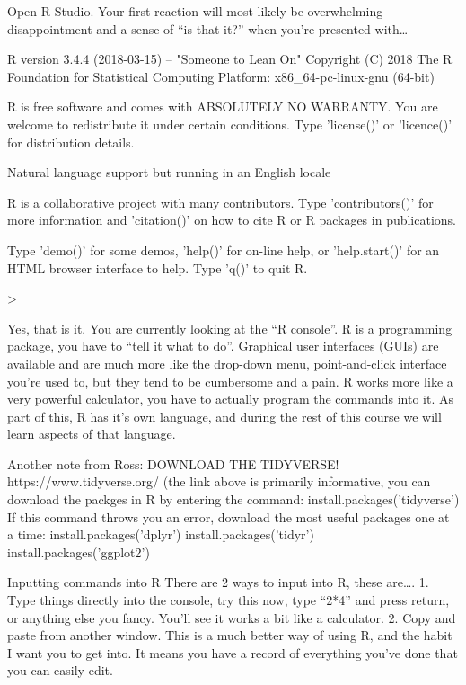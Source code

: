 \documentclass{article}
\begin{document}
Open R Studio.
Your first reaction will most likely be overwhelming disappointment and a sense of “is that it?” when you’re presented with…

R version 3.4.4 (2018-03-15) -- "Someone to Lean On"
Copyright (C) 2018 The R Foundation for Statistical Computing
Platform: x86\_64-pc-linux-gnu (64-bit)

R is free software and comes with ABSOLUTELY NO WARRANTY.
You are welcome to redistribute it under certain conditions.
Type 'license()' or 'licence()' for distribution details.

  Natural language support but running in an English locale

R is a collaborative project with many contributors.
Type 'contributors()' for more information and
'citation()' on how to cite R or R packages in publications.

Type 'demo()' for some demos, 'help()' for on-line help, or
'help.start()' for an HTML browser interface to help.
Type 'q()' to quit R.

>



Yes, that is it. You are currently looking at the “R console”. R is a programming package, you have to “tell it what to do”. Graphical user interfaces (GUIs) are available and are much more like the drop-down menu, point-and-click interface you’re used to, but they tend to be cumbersome and a pain. R works more like a very powerful calculator, you have to actually program the commands into it. As part of this, R has it’s own language, and during the rest of this course we will learn aspects of that language. 



Another note from Ross: DOWNLOAD THE TIDYVERSE!
https://www.tidyverse.org/
(the link above is primarily informative, you can download the packges in R by entering the command: install.packages('tidyverse')
If this command throws you an error, download the most useful packages one at a time:
install.packages('dplyr')
install.packages('tidyr')
install.packages('ggplot2')


Inputting commands into R
There are 2 ways to input into R, these are….
    1. Type things directly into the console, try this now, type “2*4” and press return, or anything else you fancy. You’ll see it works a bit like a calculator. 
    2. Copy and paste from another window. This is a much better way of using R, and the habit I want you to get into. It means you have a record of everything you’ve done that you can easily edit. 
\end{document}
